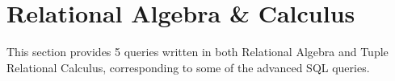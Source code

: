 \section{Relational Algebra \& Calculus}
This section provides 5 queries written in both Relational Algebra and Tuple Relational Calculus, corresponding to some of the advanced SQL queries.


